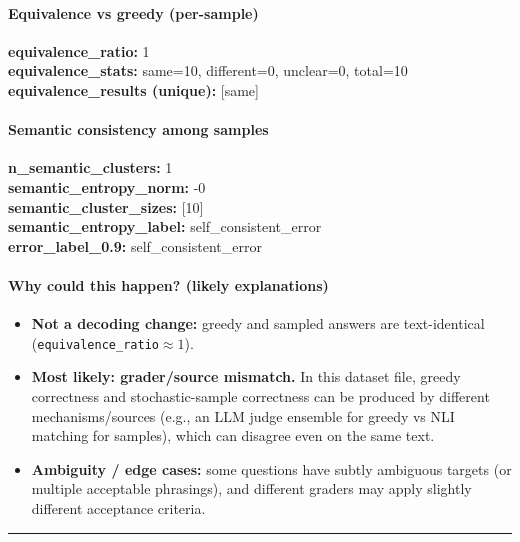 \documentclass[11pt]{article}
\newcommand{\mono}[1]{\texttt{#1}}
\begin{document}
\paragraph{Equivalence vs greedy (per-sample)}
\textbf{equivalence\_ratio:} 1\\
\textbf{equivalence\_stats:} same=10, different=0, unclear=0, total=10\\
\textbf{equivalence\_results (unique):} [same]\\
\paragraph{Semantic consistency among samples}
\textbf{n\_semantic\_clusters:} 1\\
\textbf{semantic\_entropy\_norm:} -0\\
\textbf{semantic\_cluster\_sizes:} [10]\\
\textbf{semantic\_entropy\_label:} self\_consistent\_error\\
\textbf{error\_label\_0.9:} self\_consistent\_error\\
\paragraph{Why could this happen? (likely explanations)}
\begin{itemize}\item \textbf{Not a decoding change:} greedy and sampled answers are text-identical (\mono{equivalence\_ratio}$\approx 1$).\item \textbf{Most likely: grader/source mismatch.} In this dataset file, greedy correctness and stochastic-sample correctness can be produced by different mechanisms/sources (e.g., an LLM judge ensemble for greedy vs NLI matching for samples), which can disagree even on the same text.\item \textbf{Ambiguity / edge cases:} some questions have subtly ambiguous targets (or multiple acceptable phrasings), and different graders may apply slightly different acceptance criteria.\end{itemize}
\vspace{10pt}
\hrule
\vspace{10pt}
\end{document}
